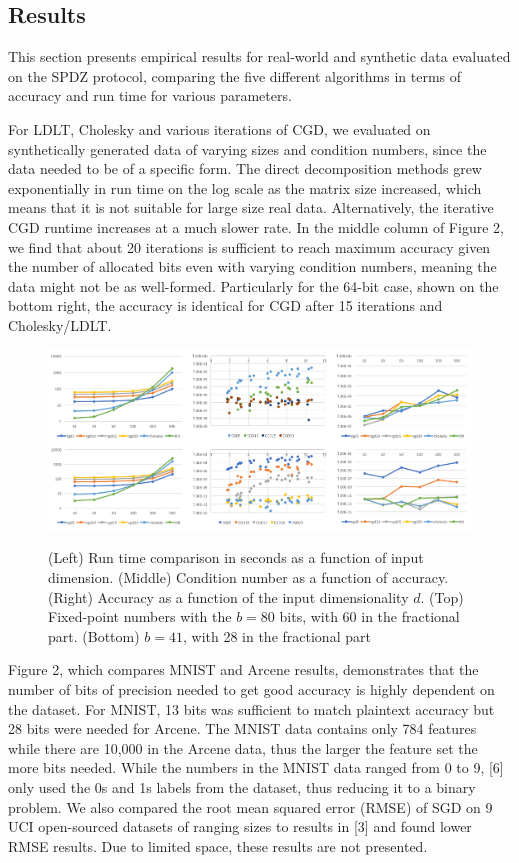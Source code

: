 \documentclass{article}
\begin{document}
\subsection{Results}

This section presents empirical results for real-world and synthetic data evaluated on the SPDZ protocol, comparing the five different algorithms in terms of accuracy and run time for various parameters. 

For LDLT, Cholesky and various iterations of CGD, we evaluated on synthetically generated data of varying sizes and condition numbers, since the data needed to be of a specific form. The direct decomposition methods grew exponentially in run time on the log scale as the matrix size increased, which means that it is not suitable for large size real data. Alternatively, the iterative CGD runtime increases at a much slower rate. In the middle column of Figure 2, we find that about 20 iterations is sufficient to reach maximum accuracy given the number of allocated bits even with varying condition numbers, meaning the data might not be as well-formed. Particularly for the 64-bit case, shown on the bottom right, the accuracy is identical for CGD after 15 iterations and Cholesky/LDLT.

\begin{figure}[h!]
\centering
  \includegraphics[scale=0.4]{allregression.png}
  \label{fig:result4}
    \caption{(Left) Run time comparison in seconds as a function of input dimension. (Middle) Condition number as a function of accuracy. (Right) Accuracy as a function of the input dimensionality $d$. (Top) Fixed-point numbers with the $b = 80$ bits, with 60 in the fractional part. (Bottom) $b = 41$, with 28 in the fractional part}
\end{figure}

Figure 2, which compares MNIST and Arcene results, demonstrates that the number of bits of precision needed to get good accuracy is highly dependent on the dataset. For MNIST, 13 bits was sufficient to match plaintext accuracy but 28 bits were needed for Arcene. The MNIST data contains only 784 features while there are 10,000 in the Arcene data, thus the larger the feature set the more bits needed. While the numbers in the MNIST data ranged from 0 to 9, [6] only used the 0s and 1s labels from the dataset, thus reducing it to a binary problem. We also compared the root mean squared error (RMSE) of SGD on 9 UCI open-sourced datasets of ranging sizes to results in [3] and found lower RMSE results. Due to limited space, these results are not presented.
\end{document}
